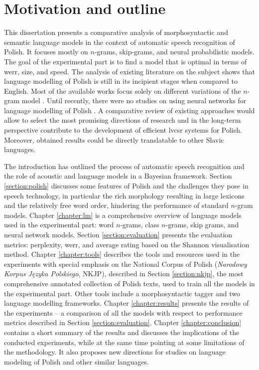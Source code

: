 \FloatBarrier
\section{Motivation and outline}
\label{section:outline}
This dissertation presents a comparative analysis of morphosyntactic and semantic language models in the context of automatic speech recognition of Polish. It focuses mostly on $n$-grams, skip-grams, and neural probabilistic models. The goal of the experimental part is to find a model that is optimal in terms of \gls{werr}, size, and speed. The analysis of existing literature on the subject shows that language modelling of Polish is still in its incipient stages when compared to English. Most of the available works focus solely on different variations of the $n$-gram model \cite{majewski2008syllable, ziolko2011n}. Until recently, there were no studies on using neural networks for language modelling of Polish \cite{gajecki2013modelowanie, brocki2012connectionist}. A comparative review of existing approaches would allow to select the most promising directions of research and in the long-term perspective contribute to the development of efficient \gls{lvcsr} systems for Polish. Moreover, obtained results could be directly translatable to other Slavic languages.

The introduction has outlined the process of automatic speech recognition and the role of acoustic and language models in a Bayesian framework. Section \ref{section:polish} discusses some features of Polish and the challenges they pose in speech technology, in particular the rich morphology resulting in large lexicons and the relatively free word order, hindering the performance of standard $n$-gram models. 
Chapter \ref{chapter:lm} is a comprehensive overview of language models used in the experimental part: word $n$-grams, class $n$-grams, skip grams, and neural network models. Section \ref{section:evaluation} presents the evaluation metrics: perplexity, \gls{werr}, and average rating based on the Shannon visualisation method.
Chapter \ref{chapter:tools} describes the tools and resources used in the experiments with special emphasis on the National Corpus of Polish (\textit{Narodowy Korpus Języka Polskiego}, NKJP), described in Section \ref{section:nkjp}, the most comprehensive annotated collection of Polish texts, used to train all the models in the experimental part. Other tools include a morphosyntactic tagger and two language modelling frameworks.
Chapter \ref{chapter:results} presents the results of the experiments -- a comparison of all the models with respect to performance metrics described in Section \ref{section:evaluation}.
Chapter \ref{chapter:conclusion} contains a short summary of the results and discusses the implications of the conducted experiments, while at the same time pointing at some limitations of the methodology. It also proposes new directions for studies on language modeling of Polish and other similar languages.
